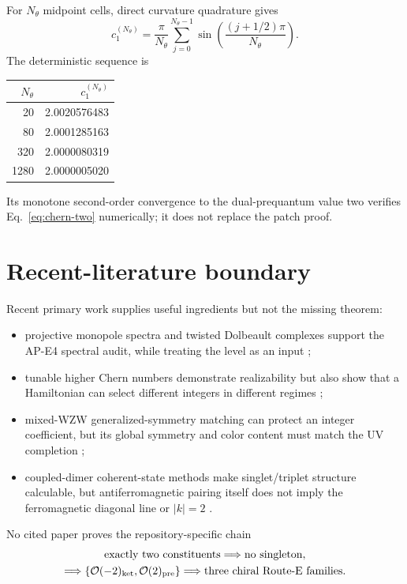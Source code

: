 \documentclass[11pt]{article}
\theoremstyle{definition}
\theoremstyle{remark}
\newcommand{\cO}{\mathcal O}
\begin{document}
For \(N_\theta\) midpoint cells, direct curvature quadrature gives
\begin{equation}
 c_1^{(N_\theta)}
 =\frac{\pi}{N_\theta}
  \sum_{j=0}^{N_\theta-1}
  \sin\left(\frac{(j+1/2)\pi}{N_\theta}\right).
\end{equation}
The deterministic sequence is
\begin{center}
\begin{tabular}{@{}rr@{}}
\toprule
\(N_\theta\) & \(c_1^{(N_\theta)}\)\\
\midrule
20 & 2.0020576483\\
80 & 2.0001285163\\
320 & 2.0000080319\\
1280 & 2.0000005020\\
\bottomrule
\end{tabular}
\end{center}
Its monotone second-order convergence to the dual-prequantum value two verifies
Eq.~\eqref{eq:chern-two} numerically; it does not replace the patch proof.

\section{Recent-literature boundary}

Recent primary work supplies useful ingredients but not the missing theorem:
\begin{itemize}
\item projective monopole spectra and twisted Dolbeault complexes support the
  AP-E4 spectral audit, while treating the level as an input
  \cite{BykovSmilga2023APE3};
\item tunable higher Chern numbers demonstrate realizability but also show
  that a Hamiltonian can select different integers in different regimes
  \cite{LeeEtAl2023};
\item mixed-WZW generalized-symmetry matching can protect an integer
  coefficient, but its global symmetry and color content must match the UV
  completion \cite{DavighiLohitsiri2024};
\item coupled-dimer coherent-state methods make singlet/triplet structure
  calculable, but antiferromagnetic pairing itself does not imply the
  ferromagnetic diagonal line or \(|k|=2\) \cite{ZhangEtAl2024Dimer}.
\end{itemize}
No cited paper proves the repository-specific chain
\begin{equation}
 \begin{gathered}
 \text{exactly two constituents}\Longrightarrow\text{no singleton},\\
 \Longrightarrow\{\cO(-2)_{\rm ket},\cO(2)_{\rm pre}\}
 \Longrightarrow \text{three chiral Route-E families}.
 \end{gathered}
\end{equation}
\end{document}
